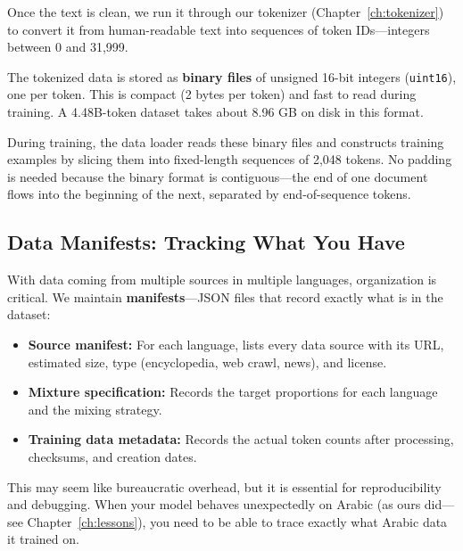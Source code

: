 \documentclass[11pt,a4paper]{article}
\begin{document}
Once the text is clean, we run it through our tokenizer (Chapter~\ref{ch:tokenizer}) to convert it from human-readable text into sequences of token IDs---integers between 0 and 31,999.

The tokenized data is stored as \textbf{binary files} of unsigned 16-bit integers (\texttt{uint16}), one per token. This is compact (2 bytes per token) and fast to read during training. A 4.48B-token dataset takes about 8.96 GB on disk in this format.

During training, the data loader reads these binary files and constructs training examples by slicing them into fixed-length sequences of 2,048 tokens. No padding is needed because the binary format is contiguous---the end of one document flows into the beginning of the next, separated by end-of-sequence tokens.

\subsection{Data Manifests: Tracking What You Have}

With data coming from multiple sources in multiple languages, organization is critical. We maintain \textbf{manifests}---JSON files that record exactly what is in the dataset:

\begin{itemize}
    \item \textbf{Source manifest:} For each language, lists every data source with its URL, estimated size, type (encyclopedia, web crawl, news), and license.
    \item \textbf{Mixture specification:} Records the target proportions for each language and the mixing strategy.
    \item \textbf{Training data metadata:} Records the actual token counts after processing, checksums, and creation dates.
\end{itemize}

This may seem like bureaucratic overhead, but it is essential for reproducibility and debugging. When your model behaves unexpectedly on Arabic (as ours did---see Chapter~\ref{ch:lessons}), you need to be able to trace exactly what Arabic data it trained on.
\end{document}
